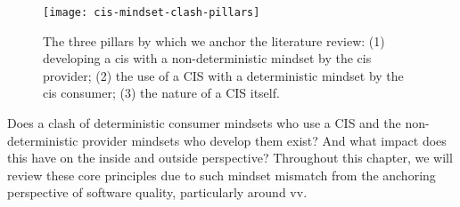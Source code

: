 \begin{figure}[hbt]
  \centering
  \texttt{[image: cis-mindset-clash-pillars]}
  \caption[Mindset clashes within the development, use and nature of a CIS]{The three pillars by which we anchor the literature review: (1) developing a \gls{cis} with a non-deterministic mindset by the \gls{cis} provider; (2) the use of a CIS with a deterministic mindset by the \gls{cis} consumer; (3) the nature of a CIS itself.}
  \label{fig:literature-review:preface:cis-mindset-clash-pillars}
\end{figure}

Does a clash of deterministic consumer mindsets who use a CIS and the non-deterministic provider mindsets who develop them exist? And what impact does this have on the inside and outside perspective? Throughout this chapter, we will review these core principles due to such  mindset mismatch from the anchoring perspective of software quality, particularly around \gls{vv}.
